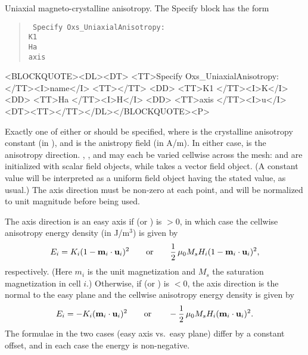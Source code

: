 \begin{description}
%
\item[Oxs\_UniaxialAnisotropy:] Uniaxial magneto-crystalline
  anisotropy.  The Specify block has the form
   \begin{latexonly}
      \begin{quote}\tt
      Specify Oxs\_UniaxialAnisotropy: \ocb\\
        \bi K1  \\
        \bi Ha  \\
        \bi axis  \\
      \ccb
      \end{quote}
   \end{latexonly}
   \begin{rawhtml}
   <BLOCKQUOTE><DL><DT>
   <TT>Specify Oxs_UniaxialAnisotropy:</TT><I>name</I> <TT>{</TT>
       <DD> <TT>K1 </TT><I>K</I>
       <DD> <TT>Ha </TT><I>H</I>
       <DD> <TT>axis </TT><I>u</I>
   <DT><TT>}</TT></DL></BLOCKQUOTE><P>
   \end{rawhtml}
  Exactly one of either  or  should be
  specified, where  is the crystalline anisotropy constant
  (in
  ),
  and  is the anistropy field (in A/m).  In either case,
   is the anisotropy direction.  ,
  , and  may each be varied cellwise across
  the mesh:  and  are initialized with scalar
  field objects, while  takes a vector field object.  (A
  constant value will be interpreted as a uniform field object having
  the stated value, as usual.)  The axis direction must be non-zero at
  each point, and will be normalized to unit magnitude before being
  used.

  The axis direction is an easy axis if  (or )
  is $>$0, in which case the cellwise anisotropy energy density (in
  J/m${}^3$) is given by
   \begin{displaymath}
         E_i = K_i(1 - \textbf{m}_i\cdot\textbf{u}_i)^2 \qquad \mbox{or} \qquad
               \frac{1}{2}\, \mu_0 M_s H_i (1 - \textbf{m}_i\cdot\textbf{u}_i)^2,
   \end{displaymath}
  respectively.  (Here $m_i$ is the unit magnetization and $M_s$ the
  saturation magnetization in cell $i$.)  Otherwise, if 
  (or ) is $<0$, the axis direction is the normal to the
  easy plane and the cellwise anisotropy energy density is given by
   \begin{displaymath}
         E_i = -K_i(\textbf{m}_i\cdot\textbf{u}_i)^2 \qquad \mbox{or} \qquad
               -\frac{1}{2}\, \mu_0 M_s H_i (\textbf{m}_i\cdot\textbf{u}_i)^2.
   \end{displaymath}
  The formulae in the two cases (easy axis vs.\ easy plane) differ by a
  constant offset, and in each case the energy is non-negative.


\end{description}
